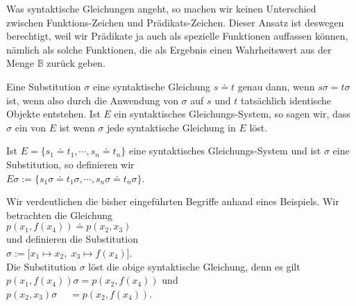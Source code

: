 Was syntaktische Gleichungen angeht, so machen wir keinen Unterschied zwischen Funktions-Zeichen und
Prädikats-Zeichen.   Dieser Ansatz ist deswegen berechtigt, weil wir Prädikate
ja auch als spezielle Funktionen auffassen können, nämlich als solche
Funktionen, die als Ergebnis einen Wahrheitswert aus der Menge  $\mathbb{B}$ zurück geben.

\begin{Definition}[Unifikator]
Eine Substitution $\sigma$   eine syntaktische
Gleichung $s \doteq t$ genau dann, wenn 
$s\sigma = t\sigma$ ist, wenn also durch die Anwendung von $\sigma$ auf $s$ und $t$
tatsächlich identische Objekte entstehen.  Ist $E$ ein syntaktisches Gleichungs-System, so 
sagen wir, dass $\sigma$ ein   von $E$ ist wenn $\sigma$ jede
syntaktische Gleichung in $E$ löst. 
\eox
\end{Definition}
Ist $E = \{ s_1 \doteq t_1, \cdots, s_n \doteq t_n \}$ eine syntaktisches Gleichungs-System
und ist $\sigma$ eine Substitution, so definieren wir \\[0.2cm]
\hspace*{1.3cm}  $E\sigma := \{ s_1\sigma \doteq t_1\sigma, \cdots, s_n\sigma \doteq t_n\sigma \}$.
\vspace{0.3cm}

\example
Wir verdeutlichen die bisher eingeführten Begriffe anhand eines Beispiels.  
Wir betrachten die Gleichung \\[0.2cm]
\hspace*{1.3cm} $p(x_1, f(x_4)) \doteq p( x_2, x_3)$ \\[0.2cm]
und definieren die Substitution \\[0.2cm]
\hspace*{1.3cm} $\sigma := \big[ x_1 \mapsto x_2,\; x_3 \mapsto f(x_4) \big]$. \\[0.2cm]
Die Substitution $\sigma$ löst die obige syntaktische Gleichung, denn es gilt \\[0.2cm]
\hspace*{1.3cm} $p(x_1, f(x_4))\sigma = p(x_2, f(x_4))$ \quad und \quad \\[0.2cm]
\hspace*{1.3cm} $p(x_2, x_3)\sigma \;\quad = p(x_2, f(x_4))$.  \eox


